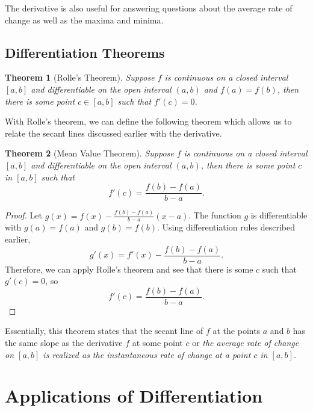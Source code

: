 \documentclass[12pt]{article}
\newtheorem{thm}{Theorem}[section]
\theoremstyle{definition}
\theoremstyle{plain}
\numberwithin{equation}{section}
\begin{document}
The derivative is also useful for answering questions about the average rate of change as well as the maxima and minima.


\subsection{Differentiation Theorems}

\begin{thm}[Rolle's Theorem]
Suppose $f$ is continuous on a closed interval $[a,b]$ and differentiable on the open interval $(a,b)$ and $f(a)=f(b)$, then there is some point $c\in [a,b]$ such that $f'(c)=0$.
\end{thm}

With Rolle's theorem, we can define the following theorem which allows us to relate the secant lines discussed earlier with the derivative.
\begin{thm}[Mean Value Theorem]\label{MVTD}
Suppose $f$ is continuous on a closed interval $[a,b]$ and differentiable on the open interval $(a,b)$, then there is some point $c$ in $[a,b]$ such that
\begin{equation}
	f'(c)=\frac{f(b)-f(a)}{b-a}.
\end{equation}
\end{thm}
\begin{proof}
Let $g(x)=f(x)-\frac{f(b)-f(a)}{b-a}(x-a)$. The function $g$ is differentiable with $g(a)=f(a)$ and $g(b)=f(b)$. Using differentiation rules described earlier,
\begin{equation}
	g'(x)=f'(x)-\frac{f(b)-f(a)}{b-a}.
\end{equation}
Therefore, we can apply Rolle's theorem and see that there is some $c$ such that $g'(c)=0$, so
\begin{equation}
	f'(c)=\frac{f(b)-f(a)}{b-a}.
\end{equation}
\end{proof}

Essentially, this theorem states that the secant line of $f$ at the points $a$ and $b$ has the same slope as the derivative $f$ at some point $c$ or \emph{the average rate of change on $[a,b]$ is realized as the instantaneous rate of change at a point $c$ in $[a,b]$}.


\section{Applications of Differentiation}
\end{document}
